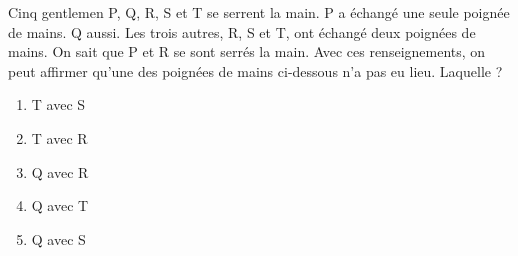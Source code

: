 Cinq gentlemen P, Q, R, S et T se serrent la main. P a échangé une seule poignée de mains. Q aussi. Les trois autres, R, S et T, ont échangé deux poignées de mains. On sait que P et R se sont serrés la main. Avec ces renseignements, on peut affirmer qu'une des poignées de mains ci-dessous n'a pas eu lieu. Laquelle ?
\begin{multicols}{5}
  \begin{enumerate}[A/]
  \item T avec S
  \item T avec R
  \item Q avec R
  \item Q avec T
  \item Q avec S
  \end{enumerate}
\end{multicols}